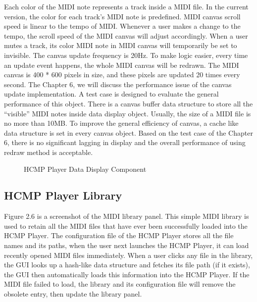 Each color of the MIDI note represents a track inside 
a MIDI file. In the current version, the color for each track's MIDI note is 
predefined. MIDI canvas scroll speed is linear to the tempo of MIDI. Whenever 
a user makes a change to the tempo, the scroll speed of the MIDI canvas will adjust
accordingly. When a user mutes a
track, its color MIDI note in MIDI canvas will temporarily be set to invisible. 
The canvas
update frequency is 20Hz. To make logic easier, every time an update event 
happens, the whole MIDI canvas will be redrawn. The MIDI canvas is 400 * 600 pixels
in size, and these pixels are updated 20 times every second. The Chapter 6, we will
discuss the performance issue of the canvas update implementation. A test case is
designed to evaluate the general performance of this object. There is a canvas 
buffer data structure to store all the ``visible'' MIDI notes inside data 
display object. Usually, the size of a MIDI file is no more than 10MB. To improve
the general efficiency of canvas, a cache like data structure is set in 
every canvas object. Based on the test case of the Chapter 6, there is no
significant lagging in display and the overall performance of using redraw 
method is acceptable.

\begin{figure}[H]
\caption{HCMP Player Data Display Component}
\end{figure}

\subsection{HCMP Player Library}

Figure 2.6 is a screenshot of the MIDI library panel. This simple MIDI library is 
used to retain all the MIDI files that have ever been successfully loaded into 
the HCMP Player. 
The configuration file of the HCMP Player stores all the file names and its paths, 
when the user next launches the HCMP Player, it can load
recently opened MIDI files immediately. When a user clicks any file in the library, 
the GUI looks up a hash-like data structure and fetches its file path 
(if it exists), the GUI then automatically
loads this information into the HCMP Player. If the MIDI file failed to load, 
the library and its configuration file will remove the obsolete entry, then 
update the library panel.

